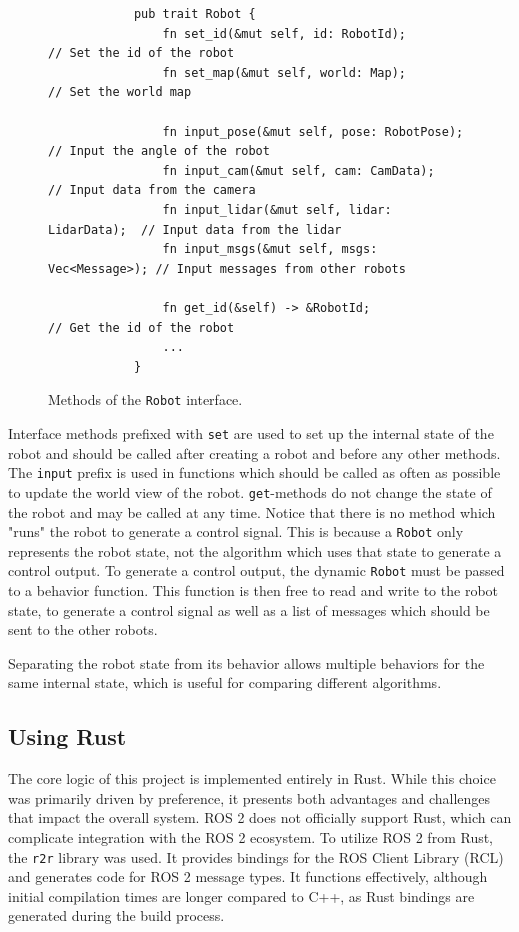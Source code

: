 \begin{figure}[H]
    \begin{center}
        \begin{verbatim}
            pub trait Robot {
                fn set_id(&mut self, id: RobotId);            // Set the id of the robot
                fn set_map(&mut self, world: Map);            // Set the world map

                fn input_pose(&mut self, pose: RobotPose);    // Input the angle of the robot
                fn input_cam(&mut self, cam: CamData);        // Input data from the camera
                fn input_lidar(&mut self, lidar: LidarData);  // Input data from the lidar
                fn input_msgs(&mut self, msgs: Vec<Message>); // Input messages from other robots

                fn get_id(&self) -> &RobotId;                 // Get the id of the robot
                ...
            }
        \end{verbatim}
    \end{center}
    \caption{Methods of the \texttt{Robot} interface.}\label{fig:robot-interface}
\end{figure}

Interface methods prefixed with \texttt{set} are used to set up the internal state of the robot and should be called after creating a robot and before any other methods. The \texttt{input} prefix is used in functions which should be called as often as possible to update the world view of the robot. \texttt{get}-methods do not change the state of the robot and may be called at any time. Notice that there is no method which "runs" the robot to generate a control signal. This is because a \texttt{Robot} only represents the robot state, not the algorithm which uses that state to generate a control output. To generate a control output, the dynamic \texttt{Robot} must be passed to a behavior function. This function is then free to read and write to the robot state, to generate a control signal as well as a list of messages which should be sent to the other robots.

Separating the robot state from its behavior allows multiple behaviors for the same internal state, which is useful for comparing different algorithms.

\subsection{Using Rust}
The core logic of this project is implemented entirely in Rust. While this choice was primarily driven by preference, it presents both advantages and challenges that impact the overall system. ROS 2 does not officially support Rust, which can complicate integration with the ROS 2 ecosystem. To utilize ROS 2 from Rust, the \texttt{r2r} library \cite{r2r} was used. It provides bindings for the ROS Client Library (RCL) and generates code for ROS 2 message types. It functions effectively, although initial compilation times are longer compared to C++, as Rust bindings are generated during the build process. \\

